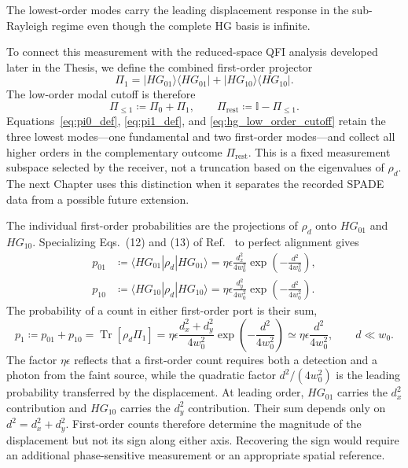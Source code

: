 \faLightbulb \hspace{5pt} The lowest-order modes carry the leading displacement response in the sub-Rayleigh regime even though the complete HG basis is infinite.

To connect this measurement with the reduced-space QFI analysis developed later in the Thesis, we define the combined first-order projector
\begin{equation}
    \Pi_1=|HG_{01}\rangle\langle HG_{01}|
    +|HG_{10}\rangle\langle HG_{10}|.
    \label{eq:pi1_def}
\end{equation}
The low-order modal cutoff is therefore
\begin{equation}
    \Pi_{\leq1}\coloneqq\Pi_0+\Pi_1,
    \qquad
    \Pi_{\mathrm{rest}}\coloneqq\mathbb{I}-\Pi_{\leq1}.
    \label{eq:hg_low_order_cutoff}
\end{equation}
Equations~\eqref{eq:pi0_def}, \eqref{eq:pi1_def}, and \eqref{eq:hg_low_order_cutoff} retain the three lowest modes---one fundamental and two first-order modes---and collect all higher orders in the complementary outcome $\Pi_{\mathrm{rest}}$.  This is a fixed measurement subspace selected by the receiver, not a truncation based on the eigenvalues of $\rho_d$.  The next Chapter uses this distinction when it separates the recorded SPADE data from a possible future extension.

The individual first-order probabilities are the projections of $\rho_d$ onto $HG_{01}$ and $HG_{10}$.  Specializing Eqs.~(12) and (13) of Ref.~\cite{Santamaria2024single} to perfect alignment gives
\begin{align}
    p_{01}
     & \coloneqq\langle HG_{01}|\rho_d|HG_{01}\rangle
    =\eta\epsilon\frac{d_x^2}{4w_0^2}
    \exp\!\left(-\frac{d^2}{4w_0^2}\right),
    \label{eq:p01_ideal}                              \\
    p_{10}
     & \coloneqq\langle HG_{10}|\rho_d|HG_{10}\rangle
    =\eta\epsilon\frac{d_y^2}{4w_0^2}
    \exp\!\left(-\frac{d^2}{4w_0^2}\right).
    \label{eq:p10_ideal}
\end{align}
The probability of a count in either first-order port is their sum,
\begin{equation}
    p_1\coloneqq p_{01}+p_{10}
    =\operatorname{Tr}[\rho_d\Pi_1]
    =\eta\epsilon\frac{d_x^2+d_y^2}{4w_0^2}
    \exp\!\left(-\frac{d^2}{4w_0^2}\right)
    \simeq\eta\epsilon\frac{d^2}{4w_0^2},
    \qquad d\ll w_0.
    \label{eq:p1_asymmetric}
\end{equation}
The factor $\eta\epsilon$ reflects that a first-order count requires both a detection and a photon from the faint source, while the quadratic factor $d^2/(4w_0^2)$ is the leading probability transferred by the displacement.  At leading order, $HG_{01}$ carries the $d_x^2$ contribution and $HG_{10}$ carries the $d_y^2$ contribution. Their sum depends only on $d^2=d_x^2+d_y^2$.  First-order counts therefore determine the magnitude of the displacement but not its sign along either axis.  Recovering the sign would require an additional phase-sensitive measurement or an appropriate spatial reference.

